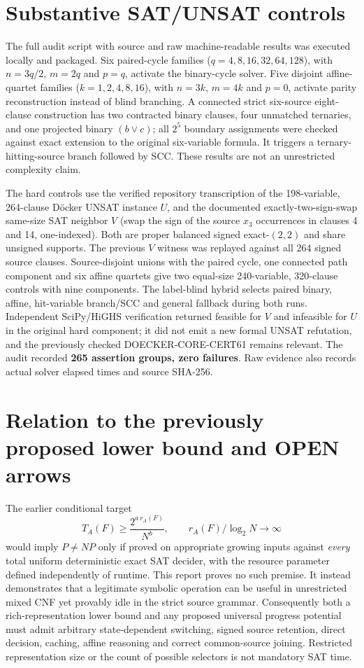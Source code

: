 \documentclass[11pt]{article}
\begin{document}
\section{Substantive SAT/UNSAT controls}
The full audit script with source and raw machine-readable results was executed locally and packaged. Six paired-cycle families ($q=4,8,16,32,64,128$), with $n=3q/2$, $m=2q$ and $p=q$, activate the binary-cycle solver. Five disjoint affine-quartet families ($k=1,2,4,8,16$), with $n=3k$, $m=4k$ and $p=0$, activate parity reconstruction instead of blind branching. A connected strict six-source eight-clause construction has two contracted binary clauses, four unmatched ternaries, and one projected binary $(b\lor c)$; all $2^5$ boundary assignments were checked against exact extension to the original six-variable formula. It triggers a ternary-hitting-source branch followed by SCC. These results are not an unrestricted complexity claim.

The hard controls use the verified repository transcription of the 198-variable, 264-clause D\"ocker UNSAT instance $U$, and the documented exactly-two-sign-swap same-size SAT neighbor $V$ (swap the sign of the source $x_3$ occurrences in clauses 4 and 14, one-indexed). Both are proper balanced signed exact-$(2,2)$ and share unsigned supports. The previous $V$ witness was replayed against all 264 signed source clauses. Source-disjoint unions with the paired cycle, one connected path component and six affine quartets give two equal-size 240-variable, 320-clause controls with nine components. The label-blind hybrid selects paired binary, affine, hit-variable branch/SCC and general fallback during both runs. Independent SciPy/HiGHS verification returned feasible for $V$ and infeasible for $U$ in the original hard component; it did not emit a new formal UNSAT refutation, and the previously checked DOECKER-CORE-CERT61 remains relevant. The audit recorded \textbf{265 assertion groups, zero failures}. Raw evidence also records actual solver elapsed times and source SHA-256.

\section{Relation to the previously proposed lower bound and OPEN arrows}
The earlier conditional target
\[
T_A(F)\ge\frac{2^{a\,r_A(F)}}{N^b},
\qquad r_A(F)/\log_2N\rightarrow\infty
\]
would imply $P\neq NP$ only if proved on appropriate growing inputs against \emph{every} total uniform deterministic exact SAT decider, with the resource parameter defined independently of runtime. This report proves no such premise. It instead demonstrates that a legitimate symbolic operation can be useful in unrestricted mixed CNF yet provably idle in the strict source grammar. Consequently both a rich-representation lower bound and any proposed universal progress potential must admit arbitrary state-dependent switching, signed source retention, direct decision, caching, affine reasoning and correct common-source joining. Restricted representation size or the count of possible selectors is not mandatory SAT time.
\end{document}
